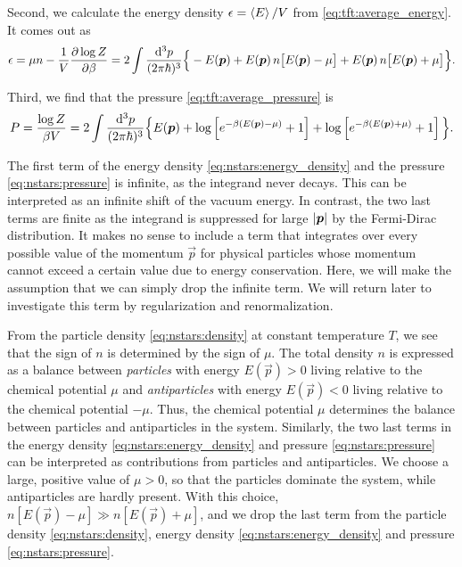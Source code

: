 Second, we calculate the energy density $\epsilon = \left< E \right> / V$ from \cref{eq:tft:average_energy}.
It comes out as
\begin{equation}
	\epsilon = 
	\mu n - \frac{1}{V} \pdv{\log Z}{\beta} =
	2 \int \frac{\mathop{}\!\mathrm{d}^3 p}{(2 \pi \hbar)^3} \Big\{ -E({\bm{p}}) + E({\bm{p}}) \, n\big[ E({\bm{p}})-\mu \big] + E({\bm{p}}) \, n\big[ E({\bm{p}})+\mu \big] \Big\}.
\label{eq:nstars:energy_density}
\end{equation}

Third, we find that the pressure \eqref{eq:tft:average_pressure} is
\begin{equation}
	P =
	\frac{\log Z}{\beta V} = 
	2 \int \frac{\mathop{}\!\mathrm{d}^3 p}{(2 \pi \hbar)^3} \Big\{ E({\bm{p}}) + \log \left[ e^{-\beta(E({\bm{p}})-\mu)} + 1 \right] + \log \left[ e^{-\beta(E({\bm{p}})+\mu)} + 1 \right] \Big\}.
\label{eq:nstars:pressure}
\end{equation}

The first term of the energy density \eqref{eq:nstars:energy_density} and the pressure \eqref{eq:nstars:pressure} is infinite, as the integrand never decays.
This can be interpreted as an infinite shift of the vacuum energy.
In contrast, the two last terms are finite as the integrand is suppressed for large $\left\lvert {\bm{p}} \right\rvert$ by the Fermi-Dirac distribution.
It makes no sense to include a term that integrates over every possible value of the momentum $\vec{p}$ for physical particles whose momentum cannot exceed a certain value due to energy conservation.
Here, we will make the assumption that we can simply drop the infinite term.
We will return later to investigate this term by regularization and renormalization. 

From the particle density \eqref{eq:nstars:density} at constant temperature $T$, we see that the sign of $n$ is determined by the sign of $\mu$.
The total density $n$ is expressed as a balance between \emph{particles} with energy $E(\vec{p}) > 0$ living relative to the chemical potential $\mu$ and \emph{antiparticles} with energy $E(\vec{p}) < 0$ living relative to the chemical potential $-\mu$.
Thus, the chemical potential $\mu$ determines the balance between particles and antiparticles in the system.
Similarly, the two last terms in the energy density \eqref{eq:nstars:energy_density} and pressure \eqref{eq:nstars:pressure} can be interpreted as contributions from particles and antiparticles.
We choose a large, positive value of $\mu > 0$, so that the particles dominate the system, while antiparticles are hardly present.
With this choice, $n \left[ E(\vec{p}) - \mu \right] \gg n \left[ E(\vec{p}) + \mu \right]$, and we drop the last term from the particle density \eqref{eq:nstars:density}, energy density \eqref{eq:nstars:energy_density} and pressure \eqref{eq:nstars:pressure}.

